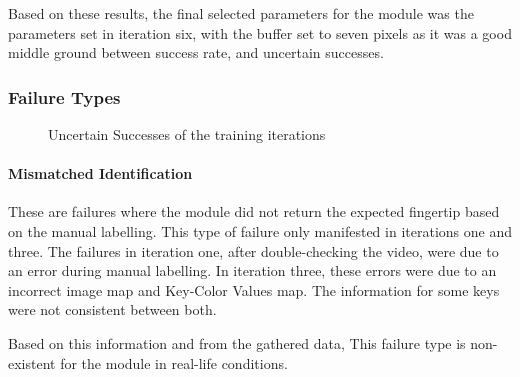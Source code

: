 \documentclass{report}
\begin{document}
Based on these results, the final selected parameters for the module was the
parameters set in iteration six, with the buffer set to seven pixels as it was a
good middle ground between success rate, and uncertain successes.


\subsubsection{Failure Types}

\begin{figure}[H]
	\centering
	\caption{Uncertain Successes of the training iterations}
	\label{fig:rd-training-uncertain-successes}
\end{figure}

\paragraph{Mismatched Identification}
These are failures where the module did not return the expected fingertip based
on the manual labelling. This type of failure only manifested in iterations one
and three. The failures in iteration one, after double-checking the video, were
due to an error during manual labelling. In iteration three, these errors were
due to an incorrect image map and Key-Color Values map. The information for some
keys were not consistent between both.

Based on this information and from the gathered data, This failure type is
non-existent for the module in real-life conditions.
\end{document}
